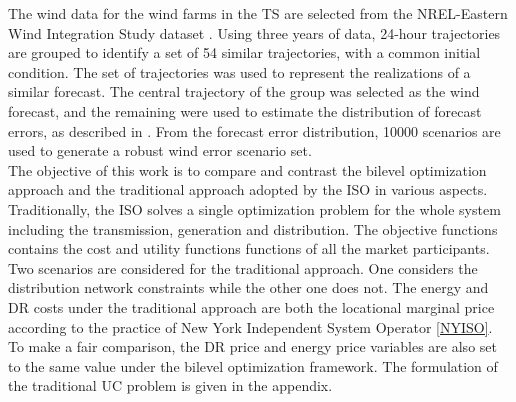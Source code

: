 The wind data for the wind farms in the TS are selected from the
NREL-Eastern Wind Integration Study dataset \cite{energy2010eastern}.
Using three years of data, 24-hour trajectories are grouped
to identify a set of 54 similar trajectories, with a common initial
condition. The set of trajectories was used
to represent the realizations of a similar forecast. The central
trajectory of the group was selected as the wind forecast,
and the remaining were used to estimate the distribution of
forecast errors, as described in \cite{anderson2011wind}. From the forecast error
distribution, 10000 scenarios are used to generate a robust
wind error scenario set. \\

The objective of this work is to compare and contrast the bilevel optimization approach and the traditional approach adopted by the ISO in various aspects. Traditionally, the ISO solves a single optimization problem for the whole system including the transmission, generation and distribution. The objective functions contains the cost  and utility functions functions of all the market participants.  Two scenarios are considered for the traditional approach. One considers the distribution network constraints while the other one does not. The energy and DR costs under the traditional approach are both the locational marginal price according to the practice of New York Independent System Operator \ref{NYISO}. To make a fair comparison, the DR price and energy price variables are also set to the same value under the bilevel optimization framework. The formulation of the traditional UC problem is given in the appendix.\\


